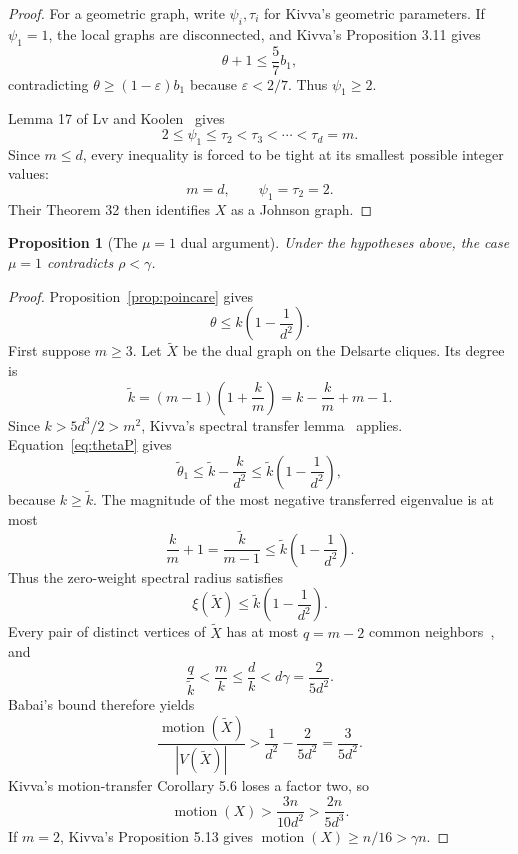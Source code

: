 \documentclass[11pt]{amsart}
\newtheorem{proposition}[theorem]{Proposition}
\theoremstyle{definition}
\newcommand{\mot}{\operatorname{motion}}
\newcommand{\eps}{\varepsilon}
\newcommand{\gam}{\gamma}
\begin{document}
\begin{proof}
For a geometric graph, write $\psi_i,\tau_i$ for Kivva's geometric parameters.  If $\psi_1=1$, the local graphs are disconnected, and Kivva's Proposition 3.11 gives
\[
 \theta+1\le\frac57b_1,
\]
contradicting $\theta\ge(1-\eps)b_1$ because $\eps<2/7$.  Thus $\psi_1\ge2$.

Lemma 17 of Lv and Koolen~\cite{LK} gives
\[
 2\le\psi_1\le\tau_2<\tau_3<\cdots<\tau_d=m.
\]
Since $m\le d$, every inequality is forced to be tight at its smallest possible integer values:
\[
 m=d,\qquad \psi_1=\tau_2=2.
\]
Their Theorem 32 then identifies $X$ as a Johnson graph.
\end{proof}

\begin{proposition}[The $\mu=1$ dual argument]\label{prop:mu1}
Under the hypotheses above, the case $\mu=1$ contradicts $\rho<\gam$.
\end{proposition}

\begin{proof}
Proposition~\ref{prop:poincare} gives
\begin{equation}\label{eq:thetaP}
 \theta\le k\left(1-\frac1{d^2}\right).
\end{equation}
First suppose $m\ge3$.  Let $\widetilde X$ be the dual graph on the Delsarte cliques.  Its degree is
\[
 \widetilde k=(m-1)\left(1+\frac{k}{m}\right)
 =k-\frac{k}{m}+m-1.
\]
Since $k>5d^3/2>m^2$, Kivva's spectral transfer lemma~\cite[Lemma 2.27]{Kivva} applies.  Equation~\eqref{eq:thetaP} gives
\[
 \widetilde\theta_1\le\widetilde k-\frac{k}{d^2}
 \le\widetilde k\left(1-\frac1{d^2}\right),
\]
because $k\ge\widetilde k$.  The magnitude of the most negative transferred eigenvalue is at most
\[
 \frac{k}{m}+1=\frac{\widetilde k}{m-1}
 \le\widetilde k\left(1-\frac1{d^2}\right).
\]
Thus the zero-weight spectral radius satisfies
\[
 \xi(\widetilde X)\le\widetilde k\left(1-\frac1{d^2}\right).
\]
Every pair of distinct vertices of $\widetilde X$ has at most $q=m-2$ common neighbors~\cite[Section 5.1]{Kivva}, and
\[
 \frac{q}{\widetilde k}<\frac{m}{k}\le\frac{d}{k}
 <d\gam=\frac{2}{5d^2}.
\]
Babai's bound therefore yields
\[
 \frac{\mot(\widetilde X)}{|V(\widetilde X)|}
 >\frac1{d^2}-\frac{2}{5d^2}=\frac{3}{5d^2}.
\]
Kivva's motion-transfer Corollary 5.6 loses a factor two, so
\[
 \mot(X)>\frac{3n}{10d^2}>\frac{2n}{5d^3}.
\]
If $m=2$, Kivva's Proposition 5.13 gives $\mot(X)\ge n/16>\gam n$.
\end{proof}
\end{document}
